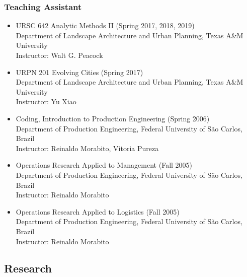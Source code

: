 \documentclass[11pt,oneside]{article}
\begin{document}
\subsubsection{Teaching Assistant}
\begin{itemize}[leftmargin=40pt, label={-}]
\item {\frutigerregular URSC 642 Analytic Methods II} (Spring 2017, 2018, 2019)\\
      {Department of Landscape Architecture and Urban Planning, Texas A\&M University}\\
      Instructor: Walt G. Peacock
\item {\frutigerregular URPN 201 Evolving Cities} (Spring 2017)\\
      {Department of Landscape Architecture and Urban Planning, Texas A\&M University}\\
      Instructor: Yu Xiao
\item {\frutigerregular Coding, Introduction to Production Engineering} (Spring 2006)\\
      {Department of Production Engineering, Federal University of São Carlos, Brazil}\\
      Instructor: Reinaldo Morabito, Vitoria Pureza
\item {\frutigerregular Operations Research Applied to Management} (Fall 2005)\\
      {Department of Production Engineering, Federal University of São Carlos, Brazil}\\
      Instructor: Reinaldo Morabito
\item {\frutigerregular Operations Research Applied to Logistics} (Fall 2005)\\
      {Department of Production Engineering, Federal University of São Carlos, Brazil}\\
      Instructor: Reinaldo Morabito
\end{itemize}

\subsection{Research}
\end{document}
